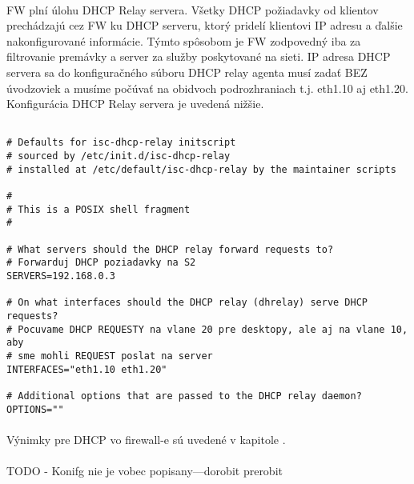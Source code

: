 \paragraph{}
FW plní úlohu DHCP Relay servera. Všetky DHCP požiadavky od klientov prechá\-dzajú cez FW ku DHCP serveru, ktorý pridelí klientovi IP adresu a ďalšie nakonfigurované informácie. Týmto spôsobom je FW zodpovedný iba za filtrovanie premávky a server za služby poskytované na sieti. IP adresa DHCP servera sa do konfiguračného súboru  DHCP relay agenta musí zadať BEZ úvodzoviek a musíme počúvať na obidvoch podrozhraniach t.j. eth1.10 aj eth1.20. Konfigurácia DHCP Relay servera je uvedená nižšie.

\noindent
{\selectfont

\begin{small}

\begin{verbatim}

# Defaults for isc-dhcp-relay initscript
# sourced by /etc/init.d/isc-dhcp-relay
# installed at /etc/default/isc-dhcp-relay by the maintainer scripts

#
# This is a POSIX shell fragment
#

# What servers should the DHCP relay forward requests to?
# Forwarduj DHCP poziadavky na S2
SERVERS=192.168.0.3

# On what interfaces should the DHCP relay (dhrelay) serve DHCP requests?
# Pocuvame DHCP REQUESTY na vlane 20 pre desktopy, ale aj na vlane 10, aby 
# sme mohli REQUEST poslat na server
INTERFACES="eth1.10 eth1.20"

# Additional options that are passed to the DHCP relay daemon?
OPTIONS=""

\end{verbatim}

\end{small}

}

\paragraph{}
Výnimky pre DHCP vo firewall-e sú uvedené v kapitole .

\paragraph{}
TODO - Konifg nie je vobec popisany---dorobit prerobit

